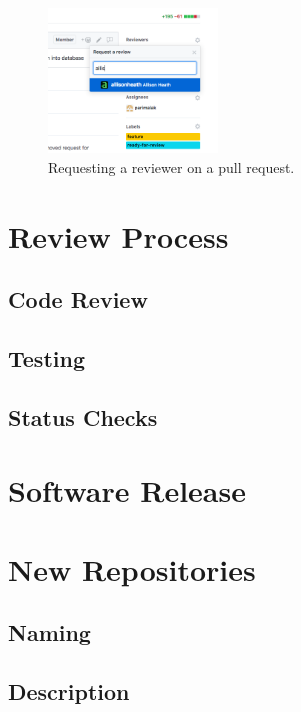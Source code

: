 \documentclass[a4paper,12pt,titlepage]{scrartcl}
\begin{document}
   	\begin{figure}
  		\centering
    		\includegraphics[width=0.4\textwidth]{images/requestreviewer.png}
    		\caption{Requesting a reviewer on a pull request.}
    		\label{fig:requestreviewer}
   	\end{figure}
   
	\section{Review Process}
	
	\subsection{Code Review}
	
	\subsection{Testing}
	
	\subsection{Status Checks}
   
	\section{Software Release}
	
	\section{New Repositories}
	
	\subsection{Naming}
	
	\subsection{Description}
	
\end{document}
